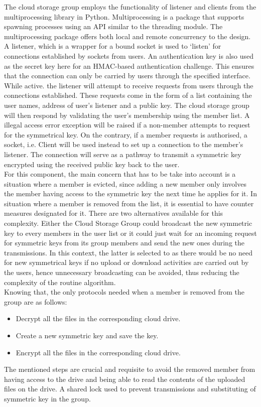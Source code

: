 \documentclass[12pt]{article}
\begin{document}
The cloud storage group employs the functionality of listener and clients from the multiprocessing library in Python. Multiprocessing is a package that supports spawning processes using an API similar to the threading module. The multiprocessing package offers both local and remote concurrency to the design. A listener, which is a wrapper for a bound socket is used to ‘listen’ for connections established by sockets from users. An authentication key is also used as the secret key here for an HMAC-based authentication challenge. This ensures that the connection can only be carried by users through the specified interface. \\

While active. the listener will attempt to receive requests from users through the connections established. These requests come in the form of a list containing the user names, address of user's listener and a public key. The cloud storage group will then respond by validating the user's membership using the member list. A illegal access error exception will be raised if a non-member attempts to request for the symmetrical key. On the contrary, if a member requests is authorised, a socket, i.e. Client will be used instead to set up a connection to the member's listener. The connection will serve as a pathway to transmit a symmetric key encrypted using the received public key back to the user. \\

For this component, the main concern that has to be take into account is a situation where a member is evicted, since adding a new member only involves the member having access to the symmetric key the next time he applies for it. In situation where a member is removed from the list, it is essential to have counter measures designated for it. There are two alternatives available for this complexity. Either the Cloud Storage Group could broadcast the new symmetric key to every members in the user list or it could just wait for an incoming request for symmetric keys from its group members and send the new ones during the transmissions. In this context, the latter is selected to as there would be no need for new symmetrical keys if no upload or download activities are carried out by the users, hence unnecessary broadcasting can be avoided, thus reducing the complexity of the routine algorithm. \\

Knowing that, the only protocols needed when a member is removed from the group are as follows:
\begin{itemize}
\item Decrypt all the files in the corresponding cloud drive.
\item Create a new symmetric key and save the key.
\item Encrypt all the files in the corresponding cloud drive.
\end{itemize}
The mentioned steps are crucial and requisite to avoid the removed member from having access to the drive and being able to read the contents of the uploaded files on the drive. A shared lock used to prevent transmissions and substituting of symmetric key in the group.
\vspace*{10mm}
\end{document}
